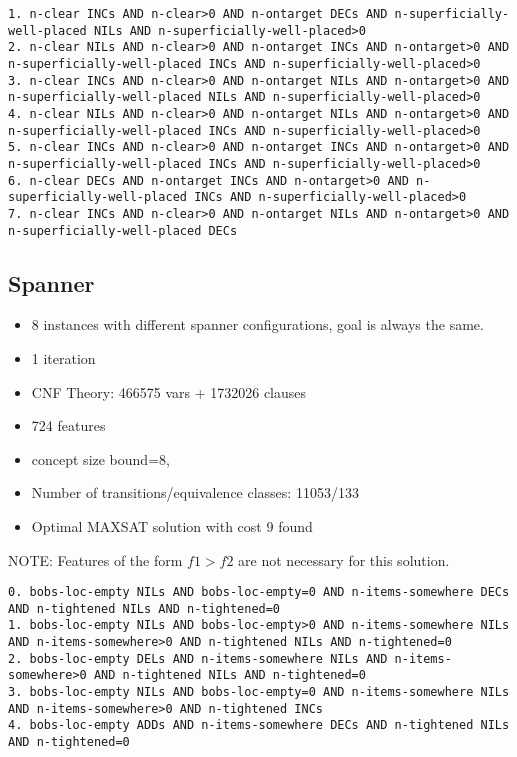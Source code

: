\documentclass[a4paper]{article}
\begin{document}
\begin{Verbatim}[fontsize=\footnotesize]
1. n-clear INCs AND n-clear>0 AND n-ontarget DECs AND n-superficially-well-placed NILs AND n-superficially-well-placed>0
2. n-clear NILs AND n-clear>0 AND n-ontarget INCs AND n-ontarget>0 AND n-superficially-well-placed INCs AND n-superficially-well-placed>0
3. n-clear INCs AND n-clear>0 AND n-ontarget NILs AND n-ontarget>0 AND n-superficially-well-placed NILs AND n-superficially-well-placed>0
4. n-clear NILs AND n-clear>0 AND n-ontarget NILs AND n-ontarget>0 AND n-superficially-well-placed INCs AND n-superficially-well-placed>0
5. n-clear INCs AND n-clear>0 AND n-ontarget INCs AND n-ontarget>0 AND n-superficially-well-placed INCs AND n-superficially-well-placed>0
6. n-clear DECs AND n-ontarget INCs AND n-ontarget>0 AND n-superficially-well-placed INCs AND n-superficially-well-placed>0
7. n-clear INCs AND n-clear>0 AND n-ontarget NILs AND n-ontarget>0 AND n-superficially-well-placed DECs
\end{Verbatim}



\subsection{Spanner}

\begin{itemize}
 \item 8 instances with different spanner configurations, goal is always the same.
 \item 1 iteration
 \item CNF Theory: 466575 vars + 1732026 clauses
 \item 724 features
 \item concept size bound=8,
 \item Number of transitions/equivalence classes: 11053/133
 \item Optimal MAXSAT solution with cost 9 found
\end{itemize}

NOTE: Features of the form $f1>f2$ are not necessary for this solution.

\begin{Verbatim}[fontsize=\footnotesize]
0. bobs-loc-empty NILs AND bobs-loc-empty=0 AND n-items-somewhere DECs AND n-tightened NILs AND n-tightened=0
1. bobs-loc-empty NILs AND bobs-loc-empty>0 AND n-items-somewhere NILs AND n-items-somewhere>0 AND n-tightened NILs AND n-tightened=0
2. bobs-loc-empty DELs AND n-items-somewhere NILs AND n-items-somewhere>0 AND n-tightened NILs AND n-tightened=0
3. bobs-loc-empty NILs AND bobs-loc-empty=0 AND n-items-somewhere NILs AND n-items-somewhere>0 AND n-tightened INCs
4. bobs-loc-empty ADDs AND n-items-somewhere DECs AND n-tightened NILs AND n-tightened=0
\end{Verbatim}




\end{document}
